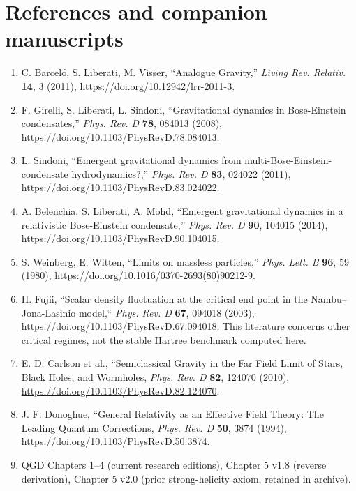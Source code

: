 \documentclass[11pt,a4paper]{article}
\theoremstyle{remark}\newtheorem{remark}[theorem]{Remark}
\begin{document}
\section*{References and companion manuscripts}
\begin{enumerate}
\item C. Barcel\'o, S. Liberati, M. Visser, ``Analogue Gravity,'' \emph{Living Rev. Relativ.} \textbf{14}, 3 (2011), \url{https://doi.org/10.12942/lrr-2011-3}.
\item F. Girelli, S. Liberati, L. Sindoni, ``Gravitational dynamics in Bose-Einstein condensates,'' \emph{Phys. Rev. D} \textbf{78}, 084013 (2008), \url{https://doi.org/10.1103/PhysRevD.78.084013}.
\item L. Sindoni, ``Emergent gravitational dynamics from multi-Bose-Einstein-condensate hydrodynamics?,'' \emph{Phys. Rev. D} \textbf{83}, 024022 (2011), \url{https://doi.org/10.1103/PhysRevD.83.024022}.
\item A. Belenchia, S. Liberati, A. Mohd, ``Emergent gravitational dynamics in a relativistic Bose-Einstein condensate,'' \emph{Phys. Rev. D} \textbf{90}, 104015 (2014), \url{https://doi.org/10.1103/PhysRevD.90.104015}.
\item S. Weinberg, E. Witten, ``Limits on massless particles,'' \emph{Phys. Lett. B} \textbf{96}, 59 (1980), \url{https://doi.org/10.1016/0370-2693(80)90212-9}.
\item H. Fujii, ``Scalar density fluctuation at the critical end point in the Nambu--Jona-Lasinio model,`` \emph{Phys. Rev. D} \textbf{67}, 094018 (2003), \url{https://doi.org/10.1103/PhysRevD.67.094018}. This literature concerns other critical regimes, not the stable Hartree benchmark computed here.
\item E. D. Carlson et al., ``Semiclassical Gravity in the Far Field Limit of Stars, Black Holes, and Wormholes, \emph{Phys. Rev. D} \textbf{82}, 124070 (2010), \url{https://doi.org/10.1103/PhysRevD.82.124070}.
\item J. F. Donoghue, ``General Relativity as an Effective Field Theory: The Leading Quantum Corrections, \emph{Phys. Rev. D} \textbf{50}, 3874 (1994), \url{https://doi.org/10.1103/PhysRevD.50.3874}.
\item QGD Chapters 1--4 (current research editions), Chapter 5 v1.8 (reverse derivation), Chapter 5 v2.0 (prior strong-helicity axiom, retained in archive).
\end{enumerate}
\end{document}
